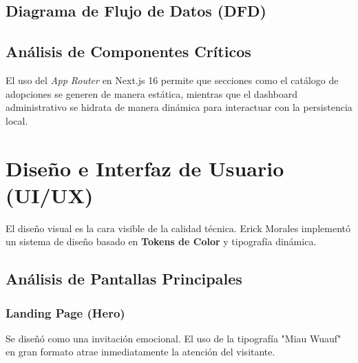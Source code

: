 \documentclass[12pt,a4paper,oneside]{report}
\begin{document}
\section{Diagrama de Flujo de Datos (DFD)}

\begin{center}
\end{center}

\section{Análisis de Componentes Críticos}
El uso del \textit{App Router} en Next.js 16 permite que secciones como el catálogo de adopciones se generen de manera estática, mientras que el dashboard administrativo se hidrata de manera dinámica para interactuar con la persistencia local.

\chapter{Diseño e Interfaz de Usuario (UI/UX)}

El diseño visual es la cara visible de la calidad técnica. Erick Morales implementó un sistema de diseño basado en \textbf{Tokens de Color} y tipografía dinámica.

\section{Análisis de Pantallas Principales}

\subsection{Landing Page (Hero)}
Se diseñó como una invitación emocional. El uso de la tipografía "Miau Wuauf" en gran formato atrae inmediatamente la atención del visitante.
\end{document}
